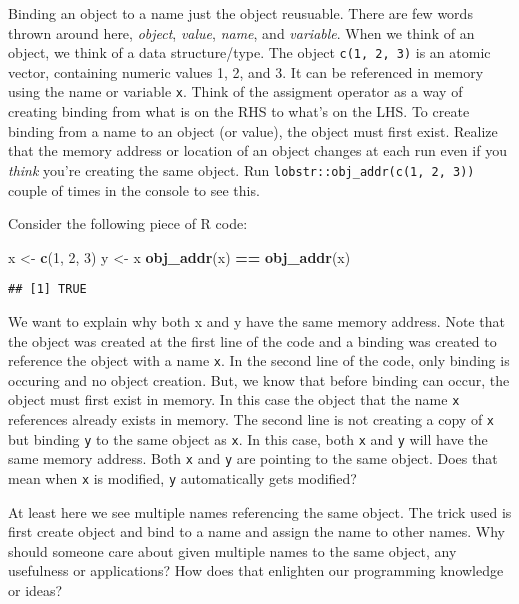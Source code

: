 \documentclass[]{book}
\newenvironment{Shaded}{\begin{snugshade}}{\end{snugshade}}
\newcommand{\DecValTok}[1]{\textcolor[rgb]{0.00,0.00,0.81}{#1}}
\newcommand{\KeywordTok}[1]{\textcolor[rgb]{0.13,0.29,0.53}{\textbf{#1}}}
\newcommand{\NormalTok}[1]{#1}
\newcommand{\OperatorTok}[1]{\textcolor[rgb]{0.81,0.36,0.00}{\textbf{#1}}}
\newcommand{\StringTok}[1]{\textcolor[rgb]{0.31,0.60,0.02}{#1}}
\begin{document}
Binding an object to a name just the object reusuable. There are few words thrown around here, \emph{object}, \emph{value}, \emph{name}, and \emph{variable}. When we think of an object, we think of a data structure/type. The object \texttt{c(1,\ 2,\ 3)} is an atomic vector, containing numeric values 1, 2, and 3. It can be referenced in memory using the name or variable \texttt{x}. Think of the assigment operator as a way of creating binding from what is on the RHS to what's on the LHS. To create binding from a name to an object (or value), the object must first exist. Realize that the memory address or location of an object changes at each run even if you \emph{think} you're creating the same object. Run \texttt{lobstr::obj\_addr(c(1,\ 2,\ 3))} couple of times in the console to see this.

Consider the following piece of R code:

\begin{Shaded}
\begin{Highlighting}[]
\NormalTok{x <-}\StringTok{ }\KeywordTok{c}\NormalTok{(}\DecValTok{1}\NormalTok{, }\DecValTok{2}\NormalTok{, }\DecValTok{3}\NormalTok{)}
\NormalTok{y <-}\StringTok{ }\NormalTok{x}
\KeywordTok{obj_addr}\NormalTok{(x) }\OperatorTok{==}\StringTok{ }\KeywordTok{obj_addr}\NormalTok{(x)}
\end{Highlighting}
\end{Shaded}

\begin{verbatim}
## [1] TRUE
\end{verbatim}

We want to explain why both x and y have the same memory address. Note that the object was created at the first line of the code and a binding was created to reference the object with a name \texttt{x}. In the second line of the code, only binding is occuring and no object creation. But, we know that before binding can occur, the object must first exist in memory. In this case the object that the name \texttt{x} references already exists in memory. The second line is not creating a copy of \texttt{x} but binding \texttt{y} to the same object as \texttt{x}. In this case, both \texttt{x} and \texttt{y} will have the same memory address. Both \texttt{x} and \texttt{y} are pointing to the same object. Does that mean when \texttt{x} is modified, \texttt{y} automatically gets modified?

At least here we see multiple names referencing the same object. The trick used is first create object and bind to a name and assign the name to other names. Why should someone care about given multiple names to the same object, any usefulness or applications? How does that enlighten our programming knowledge or ideas?
\end{document}

